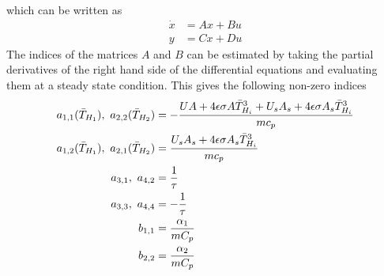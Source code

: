 which can be written as
\begin{align*}
    \dot{x} &= Ax+Bu \\
    y &= Cx+Du
\end{align*}
The indices of the matrices $A$ and $B$ can be estimated by taking the partial derivatives of the right hand side of the differential equations and evaluating them at a steady state condition. This gives the following non-zero indices\\
\begin{align*}
a_{1,1}(\Bar{T}_{H_1}),\ a_{2,2}(\Bar{T}_{H_2}) &= -\frac{U A+4 \epsilon \sigma A \Bar{T}_{H_i}^{3}+U_{s} A_{s}+4 \epsilon \sigma A_{s} \Bar{T}_{H_i}^{3}}{m c_{p}} \\
a_{1,2}(\Bar{T}_{H_1}),\ a_{2,1}(\Bar{T}_{H_2}) &= \frac{U_{s} A_{s}+4 \epsilon \sigma A_{s} \Bar{T}_{H_i}^{3}}{m c_{p}} \\
a_{3,1},\ a_{4,2} &= \frac{1}{\tau} \\
a_{3,3},\ a_{4,4} & = -\frac{1}{\tau} \\
b_{1,1} &= \frac{\alpha_1}{m C_p} \\
b_{2,2} &= \frac{\alpha_2}{m C_p}
\end{align*}








